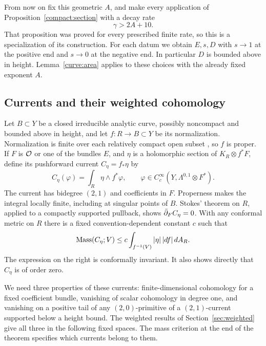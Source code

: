 From now on fix this geometric $A$, and make every application of
Proposition~\ref{compact:section} with a decay rate
\begin{equation}\label{curve:gamma-choice}
 \gamma>2A+10.
\end{equation}
That proposition was proved for every prescribed finite rate, so this
is a specialization of its construction.  For each datum we obtain
$E,s,D$ with $s\to1$ at the positive end and $s\to0$ at the negative
end.  In particular $D$ is bounded above in height.  Lemma~\ref{curve:area}
applies to these choices with the already fixed exponent $A$.

\subsection{Currents and their weighted cohomology}

Let $B\subset Y$ be a closed irreducible analytic curve, possibly
noncompact and bounded above
in height, and let $f:R\to B\subset Y$ be its normalization.
Normalization is finite over each relatively compact open subset
\cite[Chapter~II, (7.12)]{Demailly2012}, so
$f$ is proper.  If $F$ is $\mathcal O$ or one of the bundles $E$, and
$\eta$ is a holomorphic section of $K_R\otimes f^*F$, define its
pushforward current $C_\eta=f_*\eta$ by
\begin{equation}\label{curve:push-current}
 C_\eta(\varphi)=\int_R\eta\wedge f^*\varphi,
 \qquad
 \varphi\in C_c^\infty(Y,\Lambda^{0,1}\otimes F^*).
\end{equation}
The current has bidegree $(2,1)$ and coefficients in $F$.
Properness makes the integral locally finite, including at singular
points of $B$.  Stokes' theorem on $R$, applied to a compactly supported
pullback, shows $\bar\partial_F C_\eta=0$.
With any conformal metric on $R$ there is a fixed convention-dependent
constant $c$ such that
\begin{equation}\label{curve:mass-estimate}
 \operatorname{Mass}(C_\eta;V)
 \le c\int_{f^{-1}(V)}|\eta|\,|df|\,dA_R.
\end{equation}
The expression on the right is conformally invariant.  It also shows
directly that $C_\eta$ is of order zero.

We need three properties of these currents: finite-dimensional
cohomology for a fixed coefficient bundle, vanishing of scalar
cohomology in degree one, and vanishing on a positive tail of any
$(2,0)$-primitive of a $(2,1)$-current supported below a height bound. The weighted
results of Section~\ref{sec:weighted} give all three in the following
fixed spaces. The mass criterion at the end of the theorem specifies
which currents belong to them.

